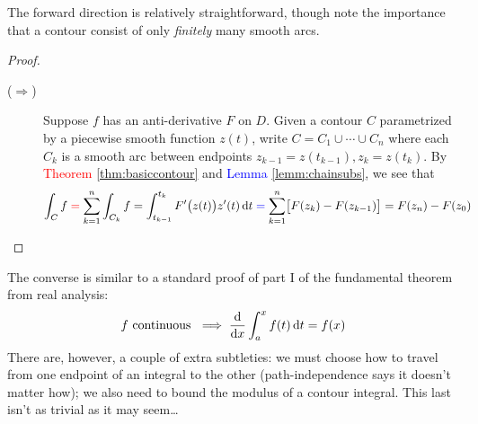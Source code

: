 \goodbreak



The forward direction is relatively straightforward, though note the importance that a contour consist of only \emph{finitely} many smooth arcs.


\begin{proof}
	\begin{description}
		\item[\normalfont ($\Rightarrow$)] Suppose $f$ has an anti-derivative $F$ on $D$. Given a contour $C$ parametrized by a piecewise smooth function $z(t)$, write $C=C_1\cup\cdots\cup C_n$ where each $C_k$ is a smooth arc between endpoints $z_{k-1}=z(t_{k-1}),z_k=z(t_k)$. By \textcolor{red}{Theorem \ref{thm:basiccontour}} and \textcolor{blue}{Lemma \ref{lemm:chainsubs}}, we see that
		\[
			\int_Cf \mathrel{\textcolor{red}{=}} \sum_{k=1}^n\int_{C_k}f
			=\int_{t_{k-1}}^{t_k}F'\bigl(z(t)\bigr)z'(t)\,\dt
			\mathrel{\textcolor{blue}{=}} \sum_{k=1}^n\bigl[F(z_k)-F(z_{k-1})\bigr] 
			=F(z_n)-F(z_0) \tag*{\phantom{\qedhere}}
		\]
	\end{description}
\end{proof}

The converse is similar to a standard proof of part I of the fundamental theorem from real analysis:
\[
	f\text{ continuous }\implies\frac{\mathrm{d} }{\mathrm{d} x}\int_a^xf(t)\,{\mathrm{d} t}=f(x)
\]
There are, however, a couple of extra subtleties: we must choose how to travel from one endpoint of an integral to the other (path-independence says it doesn't matter how); we also need to bound the modulus of a contour integral. This last isn't as trivial as it may seem\ldots
 
